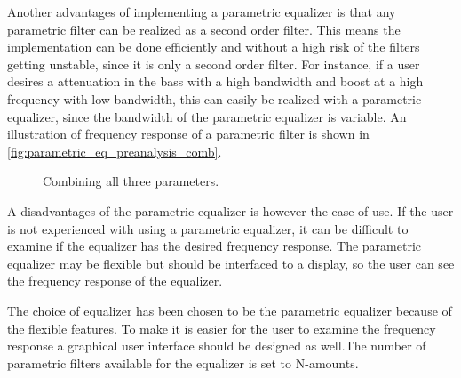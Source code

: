 Another advantages of implementing a parametric equalizer is that any parametric filter can be realized as a second order filter. This means the implementation can be done efficiently and without a high risk of the filters getting unstable, since it is only a second order filter. For instance, if a user desires a attenuation in the bass with a high bandwidth and boost at a high frequency with low bandwidth, this can easily be realized with a parametric equalizer, since the bandwidth of the parametric equalizer is variable. An illustration of frequency response of a parametric filter is shown in \autoref{fig:parametric_eq_preanalysis_comb}.

\begin{figure}[H]
\centering
{}

\caption{Combining all three parameters.}
\label{fig:parametric_eq_preanalysis_comb}
\end{figure}

A disadvantages of the parametric equalizer is however the ease of use. If the user is not experienced with using a parametric equalizer, it can be difficult to examine if the equalizer has the desired frequency response. The parametric equalizer may be flexible but should be interfaced to a display, so the user can see the frequency response of the equalizer.

The choice of equalizer has been chosen to be the parametric equalizer because of the flexible features. To make it is easier for the user to examine the frequency response a graphical user interface should be designed as well.The number of parametric filters available for the equalizer is set to N-amounts.





